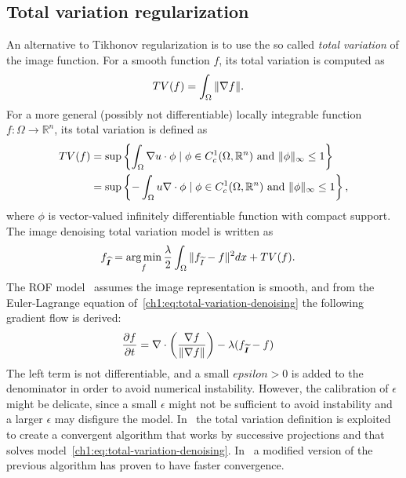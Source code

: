 \subsection{Total variation regularization}
An alternative to Tikhonov regularization is to use the so called \emph{total variation} of the image function. For a smooth function $f$, its total variation is computed as
\begin{align*}
	TV(f) &= \int_{\Omega}{ \lVert \nabla f \rVert }.
\end{align*}
%
For a more general (possibly not differentiable) locally integrable function $f:\Omega \rightarrow \mathbb{R}^n$, its total variation is defined as
\begin{align*}
	TV(f) &= \sup \left\{ \int_{\Omega}{\nabla u \cdot \phi} \; | \; \phi \in C_c^{1}(\Omega, \mathbb{R}^n) \text{ and } \lVert\phi\rVert_{\infty} \leq 1 \right\} \\
		  &= \sup \left\{ - \int_{\Omega}{u \nabla \cdot \phi} \; | \; \phi \in C_c^{1}(\Omega, \mathbb{R}^n) \text{ and } \lVert\phi\rVert_{\infty} \leq 1 \right\},	
\end{align*}
%
where $\phi$ is vector-valued infinitely differentiable function with compact support. The image denoising total variation model is written as
\begin{align}
	f_{\bm{\widehat{I}}} &= \operatorname*{arg\,min}_{f} \frac{\lambda}{2} \int_{\Omega}{ \lVert f_{\widetilde{I}} - f\rVert^2dx} + TV(f).
	\label{ch1:eq:total-variation-denoising}
\end{align}
%
The ROF model~\cite{rudin92} assumes the image representation is smooth, and from the Euler-Lagrange equation of~\cref{ch1:eq:total-variation-denoising} the following gradient flow is derived:
\begin{align*}
	\frac{\partial f}{\partial t} &= \nabla \cdot \left( \frac{\nabla f}{\lVert \nabla f\rVert } \right) - \lambda (f_{\widetilde{\bm{I}}} - f)
\end{align*}
%
The left term is not differentiable, and a small $epsilon >0$ is added to the denominator in order to avoid numerical instability. However, the calibration of $\epsilon$ might be delicate, since a small $\epsilon$ might not be sufficient to avoid instability and a larger $\epsilon$ may disfigure the model. In~\cite{chambolle04} the total variation definition is exploited to create a convergent algorithm that works by successive projections and that solves model~\cref{ch1:eq:total-variation-denoising}. In~\cite{beck09a} a modified version of the previous algorithm has proven to have faster convergence. 

